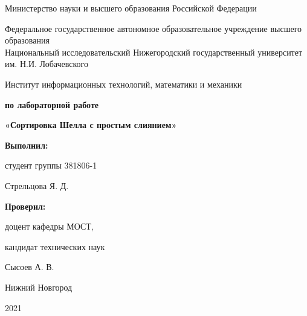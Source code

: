 \documentclass{report}
\begin{document}
\begin{titlepage}

\begin{center}
Министерство науки и высшего образования Российской Федерации
\end{center}

\begin{center}
Федеральное государственное автономное образовательное учреждение высшего образования \\
Национальный исследовательский Нижегородский государственный университет им. Н.И. Лобачевского
\end{center}

\begin{center}
Институт информационных технологий, математики и механики
\end{center}

\vspace{4em}

\begin{center}
\textbf{ по лабораторной работе} \\
\end{center}
\begin{center}
\textbf{\Large«Сортировка Шелла с простым слиянием»} \\
\end{center}

\vspace{4em}

\newbox{\lbox}
\newlength{\maxl}
\setlength{\maxl}{\wd\lbox}
\hfill\parbox{7cm}{
\hspace*{5cm}\hspace*{-5cm}\textbf{Выполнил:} \par студент группы 381806-1 \par Стрельцова Я. Д.\par
\par
\hspace*{5cm}\hspace*{-5cm}\textbf{Проверил:}\par доцент кафедры МОСТ, \par кандидат технических наук \par Сысоев А. В.\par
}

\vspace{\fill}

\begin{center} Нижний Новгород \par 2021 \end{center}

\end{titlepage}
\end{document}
